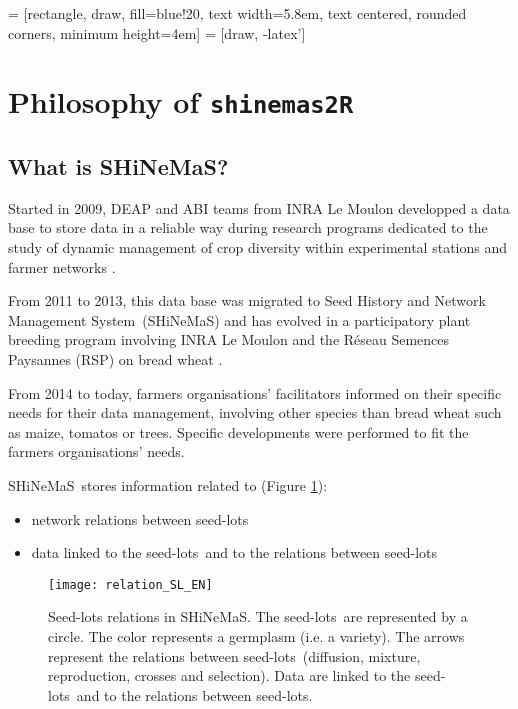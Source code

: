 \documentclass{article}\usepackage[]{graphicx}\usepackage[]{color}
\renewcommand{\sl}{seed-lots}
\newcommand{\BDfull}{Seed History and Network Management System}
\newcommand{\BD}{SHiNeMaS}
\newcommand{\pack}{\texttt{shinemas2R}}
\begin{document}
 = [rectangle, draw, fill=blue!20, text width=5.8em, text centered, rounded corners, minimum height=4em]
 = [draw, -latex']
    




\newpage


\section{Philosophy of \pack}

\subsection{What is \BD?}

Started in 2009, DEAP and ABI teams from INRA Le Moulon developped a data base to store data in a reliable way during research programs dedicated to the study of dynamic management of crop diversity within experimental stations and farmer networks \citep{thomas_gestion_2011}. 

From 2011 to 2013, this data base was migrated to \BDfull~(\BD) and has evolved in a participatory plant breeding program involving INRA Le Moulon and the Réseau Semences Paysannes (RSP) on bread wheat \citep{riviere_methodologie_2014}.

From 2014 to today, farmers organisations' facilitators informed on  their specific needs for their data management, involving other species than bread wheat such as maize, tomatos or trees. Specific developments were performed to fit the farmers organisations' needs. 

\BD~stores information related to (Figure \ref{relation_SL}):
\begin{itemize}
\item network relations between \sl
\item data linked to the \sl~and to the relations between \sl
\end{itemize}

\begin{figure}[H]
\begin{center}
\texttt{[image: relation\_SL\_EN]}
\caption{
Seed-lots relations in \BD. 
The \sl~are represented by a circle.
The color represents a germplasm (i.e. a variety).
The arrows represent the relations between \sl~(diffusion, mixture, reproduction, crosses and selection).
Data are linked to the \sl~and to the relations between \sl.
}
\label{relation_SL}
\end{center}
\end{figure}
\end{document}

